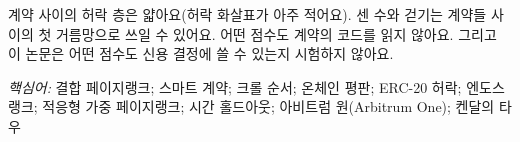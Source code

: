 계약 사이의 허락 층은 얇아요(허락 화살표가 아주 적어요). 센 수와 걷기는 계약들 사이의 첫 거름망으로 쓰일 수 있어요. 어떤 점수도 계약의 코드를 읽지 않아요. 그리고 이 논문은 어떤 점수도 신용 결정에 쓸 수 있는지 시험하지 않아요.

\emph{핵심어:} 결합 페이지랭크; 스마트 계약; 크롤 순서; 온체인 평판; ERC-20 허락; 엔도스랭크; 적응형 가중 페이지랭크; 시간 홀드아웃; 아비트럼 원(Arbitrum One); 켄달의 타우

